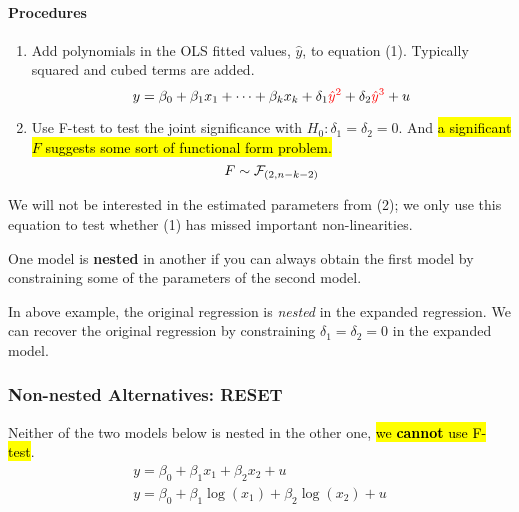 \documentclass[]{article}
\begin{document}
			\paragraph{Procedures}
			\begin{enumerate}
				\item Add polynomials in the OLS fitted values, $\hat{y}$, to equation (1). Typically squared and cubed terms are added.
					\begin{equation}
						y = \beta_0 + \beta_1 x_1 + \cdots + \beta_k x_k + \delta_1 \textcolor{red}{\hat{y}^2} + \delta_2 \textcolor{red}{\hat{y}^3} + u
					\end{equation}
				\item Use F-test to test the joint significance with $H_0: \delta_1 = \delta_2 = 0$. And \hl{a significant $F$ suggests some sort of functional form problem.}
					\[
						F \sim \mathcal{{F}}_{(2, n-k-2)}
					\]
			\end{enumerate}
			\begin{remark}
				We will not be interested in the estimated parameters from (2); we only use this equation to test whether (1) has missed important non-linearities.
			\end{remark}
			
			
			\begin{definition}
				One model is \textbf{nested} in another if you can always obtain the first model by constraining some of the parameters of the second model.
			\end{definition}
			
			\begin{example}
				In above example, the original regression is \emph{nested} in the expanded regression. We can recover the original regression by constraining $\delta_1 = \delta_2 = 0$ in the expanded model.
			\end{example}
			
			
		\subsubsection{Non-nested Alternatives: RESET}
			\par Neither of the two models below is nested in the other one, \hl{we \textbf{cannot} use F-test}.
			\begin{gather}
				y = \beta_0 + \beta_1 x_1 + \beta_2 x_2 + u \\
				y = \beta_0 + \beta_1 \log(x_1) + \beta_2 \log(x_2) + u
			\end{gather}
\end{document}
